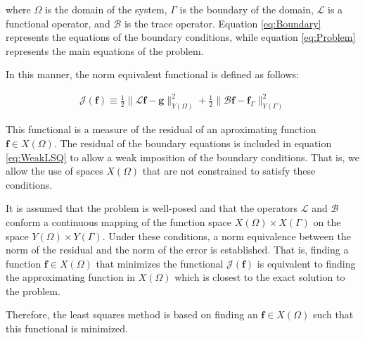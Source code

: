 \documentclass{CFD2011}
\begin{document}
\noindent where $\Omega$ is the domain of the system, $\Gamma$ is the boundary of the domain, $\mathcal{L}$ is a functional operator, and $\mathcal{B}$ is the trace operator. Equation \ref{eq:Boundary} represents the equations of the boundary conditions, while  equation \ref{eq:Problem} represents the main equations of the problem. 

In this manner, the norm equivalent functional is defined as follows:

\begin{eqnarray} 
\mathcal{J}(\mathbf{f})\equiv  \frac{1}{2}\parallel \mathcal{L} \mathbf{f} -\mathbf{g} \parallel_{Y(\Omega)}^2 + \frac{1}{2} \parallel \mathcal{B}\mathbf{f} - \mathbf{f}_{\Gamma} \parallel_{Y(\Gamma)}^2 
\label{eq:WeakLSQ}
\end{eqnarray}

This functional is a measure of the residual of an aproximating function $\mathbf{f}\in X(\Omega)$.
The residual of the boundary equations is included in equation \ref{eq:WeakLSQ} to allow a weak imposition of the boundary conditions. That is, we allow the use of spaces $X(\Omega)$ that are not constrained to satisfy these conditions.

It is assumed that the problem is well-posed and that the operators $\mathcal{L}$ and $\mathcal{B}$ conform a continuous mapping of the function space $X(\Omega)\times X(\Gamma)$ on the space $Y(\Omega) \times Y(\Gamma)$. Under these conditions, a norm equivalence between the norm of the residual and the norm of the error is established. That is, finding a function $\mathbf{f}\in X(\Omega)$ that minimizes the functional $\mathcal{J}(\mathbf{f})$ is equivalent to finding the approximating function in $X(\Omega)$ which is closest to the exact solution to the problem.

Therefore, the least squares method is based on finding an $\mathbf{f} \in X(\Omega)$ such that this functional is minimized. 
%
%
%
\end{document}
